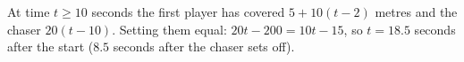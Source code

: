 At time $t\ge10$ seconds the first player has covered $5+10(t-2)$ metres and the chaser $20(t-10)$. Setting them equal: $20t-200=10t-15$, so $t=\boxed{18.5}$ seconds after the start ($8.5$ seconds after the chaser sets off).
